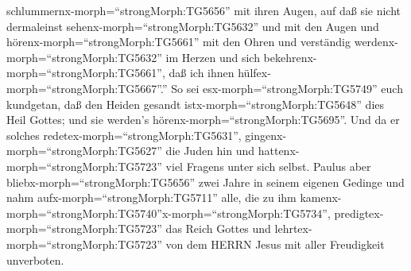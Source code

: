 schlummernx-morph=``strongMorph:TG5656'' mit ihren Augen, auf daß sie
nicht dermaleinst sehenx-morph=``strongMorph:TG5632'' und mit den Augen
und hörenx-morph=``strongMorph:TG5661'' mit den Ohren und verständig
werdenx-morph=``strongMorph:TG5632'' im Herzen und sich
bekehrenx-morph=``strongMorph:TG5661'', daß ich ihnen
hülfex-morph=``strongMorph:TG5667''.''  So sei
esx-morph=``strongMorph:TG5749'' euch kundgetan, daß den Heiden gesandt
istx-morph=``strongMorph:TG5648'' dies Heil Gottes; und sie werden's
hörenx-morph=``strongMorph:TG5695''.  Und da er solches
redetex-morph=``strongMorph:TG5631'',
gingenx-morph=``strongMorph:TG5627'' die Juden hin und
hattenx-morph=``strongMorph:TG5723'' viel Fragens unter sich selbst.
 Paulus aber bliebx-morph=``strongMorph:TG5656'' zwei Jahre
in seinem eigenen Gedinge und nahm aufx-morph=``strongMorph:TG5711''
alle, die zu ihm
kamenx-morph=``strongMorph:TG5740''\textbar x-morph=``strongMorph:TG5734'',
 predigtex-morph=``strongMorph:TG5723'' das Reich Gottes
und lehrtex-morph=``strongMorph:TG5723'' von dem HERRN Jesus mit aller
Freudigkeit unverboten.
